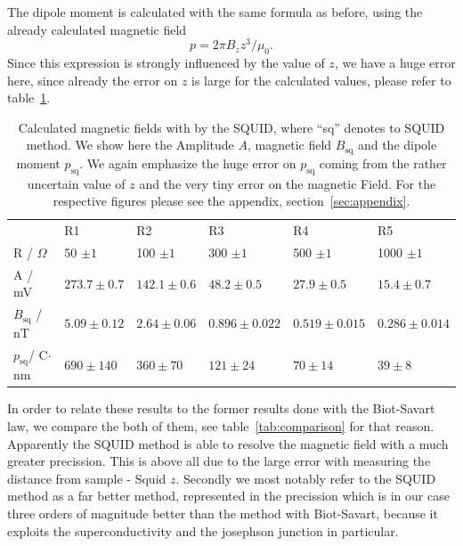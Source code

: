 The dipole moment is calculated with the same formula as before, using the already calculated magnetic field
\begin{equation}
    p  = 2 \pi  B_z z^3 / \mu_0.
\end{equation}
Since this expression is strongly influenced by the value of $z$, we have a huge error here, since 
already the error on $z$ is large for the calculated values, please refer to table~\ref{tab:squid1}. 
\begin{table}[htb]
\caption{Calculated magnetic fields with by the SQUID, where ``sq'' denotes to SQUID method. We show here the
Amplitude $A$, magnetic field $B_{\mathrm{sq}}$ and the dipole moment $p_{\mathrm{sq}}$. We again emphasize the
huge error on $p_{\mathrm{sq}}$ coming from the rather uncertain value of $z$ and the very tiny error on the magnetic
Field. For the respective figures please see the appendix, section~\ref{sec:appendix}.}
\begin{tabular}{ l| p{2.3cm}|p{2.3cm}|p{2.3cm}|p{2.3cm}|p{2.3cm}}
 \rowcolor{tabcolor}& R1 & R2 & R3 & R4 & R5 \\ 
R / $\Omega$ & 50  $\pm 1$ & 100  $\pm 1$& 300  $\pm 1$& 500 $\pm 1$ & 1000 $\pm 1$\\  
A / mV &$273.7 \pm 0.7$&$142.1 \pm 0.6$&$48.2 \pm 0.5$&$27.9 \pm 0.5$&$15.4 \pm 0.7$\\
$B_{\mathrm{sq}}$ / nT &$5.09 \pm 0.12$&$2.64 \pm 0.06$&$0.896 \pm 0.022$&$0.519 \pm 0.015$&$0.286 \pm 0.014$\\  
$p_{\mathrm{sq}}$/ C$\cdot$nm &$690 \pm 140$ & $360 \pm 70$ &$121 \pm 24$ & $70 \pm 14$ & $39 \pm 8$ \\
\end{tabular}
\label{tab:squid1}
\end{table}
In order to relate these results to the former results done with the Biot-Savart law, we compare the both
of them, see table~\ref{tab:comparison} for that reason. Apparently the SQUID method is able to 
resolve the magnetic field with a much greater precission. This is above all due to the large
error with measuring the distance from sample - Squid $z$. Secondly we  most notably refer
to the SQUID method as a far better method, represented in the precission which is in our
case three orders of magnitude better than the method with Biot-Savart, because it exploits the
superconductivity and the josephson junction in particular.
